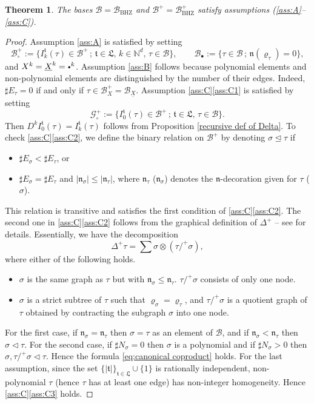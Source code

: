 \documentclass[JEP,XML,SOM,Unicode,published]{cedram}
\newcommand{\sbullet}{{\scriptscriptstyle\bullet}}
\newcommand{\scbullet}{{\raisebox{1pt}{$\sbullet$}}}
\theoremstyle{plain}
\newtheorem{thm}{Theorem}
\theoremstyle{definition}
\newcommand{\BHZ}{{\scriptscriptstyle\mathrm{BHZ}}}
\newcommand{\bsmcB}{\boldsymbol{\mathcal{B}}}
\newcommand{\frkL}{\mathfrak{L}}
\newcommand{\frkt}{\mathfrak{t}}
\newcommand{\frkn}{\mathfrak{n}}
\let\pord\trianglelefteq
\let\spord\triangleleft
\newcommand{\bbN}{\mathbb{N}}
\newcommand{\mcB}{\mathcal{B}}
\newcommand{\mcG}{\mathcal{G}}
\begin{document}
\begin{thm}\label{BHZ-ABC}
The bases $\mcB=\mcB_{\BHZ}$ and $\mcB^+=\mcB_{\BHZ}^+$ satisfy assumptions \textup{(\ref{ass:A}--\ref{ass:C})}.
\end{thm}

\begin{proof}
Assumption \eqref{ass:A} is satisfied by setting
\[
\mcB_\circ^+:=\{I_k^{\frkt}(\tau)\in\mcB^+\,;\, \frkt\in\frkL,\, k\in\bbN^d,\, \tau\in\mcB\},\qquad
\mcB_\sbullet:=\{\tau\in\mcB\,;\, \frkn(\varrho_\tau)=0\},
\]
and $X^k=\underline{X}^k=\scbullet^k$.
Assumption \eqref{ass:B} follows because polynomial elements and non-polynomial elements are distinguished by the number of their edges. Indeed, $\sharp E_\tau=0$ if and only if $\tau\in\mcB_X^+=\mcB_{\underline{X}}$.
Assumption \ref{ass:C}\eqref{ass:C1} is satisfied by setting
\[
\mcG_\circ^+:=\{I_0^{\frkt}(\tau)\in\mcB^+\,;\, \frkt\in\frkL,\, \tau\in\mcB\}.
\]
Then $D^kI_0^{\frkt}(\tau)=I_k^{\frkt}(\tau)$ follows from Proposition \ref{recursive def of Delta}.
To check \ref{ass:C}\eqref{ass:C2}, we define the binary relation on $\mcB^+$ by denoting $\sigma\pord\tau$ if
\begin{itemize}
\item $\sharp E_\sigma<\sharp E_\tau$, or
\item $\sharp E_\sigma=\sharp E_\tau$ and $|\frkn_\sigma|\le|\frkn_\tau|$, where $\frkn_\tau$ (\resp $\frkn_\sigma$) denotes the $\frkn$-decoration given for $\tau$ (\resp $\sigma$).
\end{itemize}
This relation is transitive and satisfies the first condition of \ref{ass:C}\eqref{ass:C2}.
The second one in \ref{ass:C}\eqref{ass:C2} follows from the graphical definition of $\Delta^+$ -- see \cite[\S2]{BHZ} for details. Essentially, we have the decomposition
\[
\Delta^+\tau=\sum\sigma\otimes(\tau/^+\sigma),
\]
where either of the following holds.
\begin{itemize}
\item $\sigma$ is the same graph as $\tau$ but with $\frkn_\sigma\le\frkn_\tau$.
$\tau/^+\sigma$ consists of only one node.
\item $\sigma$ is a strict subtree of $\tau$ such that $\varrho_\sigma=\varrho_\tau$, and $\tau/^+\sigma$ is a quotient graph of $\tau$ obtained by contracting the subgraph $\sigma$ into one node.
\end{itemize}
For the first case, if $\frkn_\sigma=\frkn_\tau$ then $\sigma=\tau$ as an element of $\bsmcB$, and if $\frkn_\sigma<\frkn_\tau$ then $\sigma\spord\tau$.
For the second case, if $\sharp N_\sigma=0$ then $\sigma$ is a polynomial and if $\sharp N_\sigma>0$ then $\sigma,\tau/^+\sigma\spord\tau$.
Hence the formula \eqref{eq:canonical coproduct} holds.
For the last assumption, since the set $\{|\mathfrak{t}|\}_{\mathfrak{t}\in\mathfrak{L}}\cup\{1\}$ is rationally independent, non-polynomial $\tau$ (hence $\tau$ has at least one edge) has non-integer homogeneity. Hence \ref{ass:C}\eqref{ass:C3} holds.
\end{proof}
\end{document}
